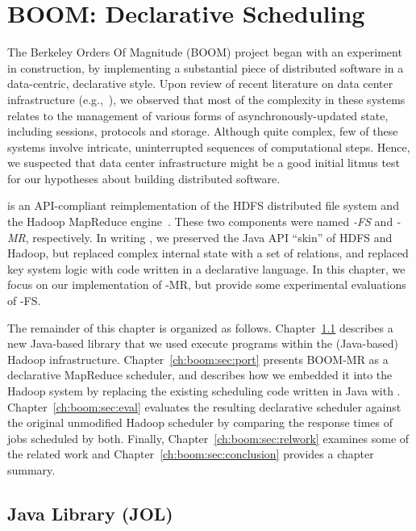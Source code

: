 \chapter[BOOM: Declarative Scheduling]{BOOM: Declarative Scheduling}
\label{ch:boom}

The Berkeley Orders Of Magnitude (BOOM) project began with an experiment in
construction, by implementing a substantial piece of distributed software in a
data-centric, declarative style.  Upon review of recent literature on
data center infrastructure (e.g.,~\cite{chubby,gfs-sosp,dynamo,mapreduce-osdi}),
we observed that most of the complexity in these systems relates to the
management of various forms of asynchronously-updated state, including
sessions, protocols and storage.  Although quite complex, few of these systems
involve intricate, uninterrupted sequences of computational steps.  Hence, we
suspected that data center infrastructure might be a good initial litmus test
for our hypotheses about building distributed software.

\emph{\BOOMA} is an API-compliant reimplementation of the HDFS distributed file
system and the Hadoop MapReduce engine~\cite{boom}.  These two components were
named \emph{\BOOM-FS} and \emph{\BOOM-MR}, respectively.  In writing \BOOMA, we
preserved the Java API ``skin'' of HDFS and Hadoop, but replaced complex
internal state with a set of relations, and replaced key system logic with code
written in a declarative language.  In this chapter, we focus on our
implementation of \BOOM-MR, but provide some experimental evaluations of
\BOOM-FS.

The remainder of this chapter is organized as follows.
Chapter~\ref{ch:boom:sec:jol} describes a new Java-based \OVERLOG library that
we used execute \OVERLOG programs within the (Java-based) Hadoop
infrastructure.  Chapter~\ref{ch:boom:sec:port} presents BOOM-MR as a
declarative MapReduce scheduler, and describes how we embedded it into the
Hadoop system by replacing the existing scheduling code written in Java with
\OVERLOG.  Chapter~\ref{ch:boom:sec:eval} evaluates the resulting declarative
scheduler against the original unmodified Hadoop scheduler by comparing the
response times of jobs scheduled by both.  Finally,
Chapter~\ref{ch:boom:sec:relwork} examines some of the related work and
Chapter~\ref{ch:boom:sec:conclusion} provides a chapter summary.

\section{Java \OVERLOG Library (JOL)}
\label{ch:boom:sec:jol}

